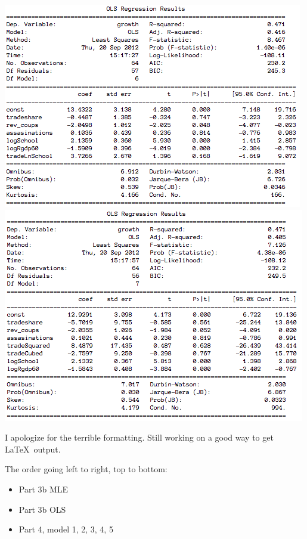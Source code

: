 \documentclass[11pt]{article}
\begin{document}
\includegraphics[scale = .5]{summary4.png}
\includegraphics[scale = .5]{summary5.png}

I apologize for the terrible formatting.  Still working on a good way to get \LaTeX\ output.

The order going left to right, top to bottom:
\begin{itemize}
  \item Part 3b MLE
  \item Part 3b OLS
  \item Part 4, model 1, 2, 3, 4, 5
\end{itemize}
\end{document}
